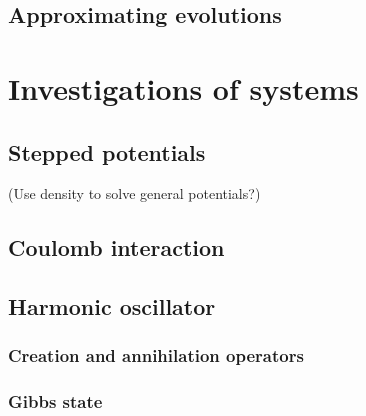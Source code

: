 \section{Approximating evolutions}

\chapter{Investigations of systems}
\section{Stepped potentials}
(Use density to solve general potentials?)
\section{Coulomb interaction}
\section{Harmonic oscillator}
\subsection{Creation and annihilation operators}

\begin{lemma}

\end{lemma}

\subsection{Gibbs state}

